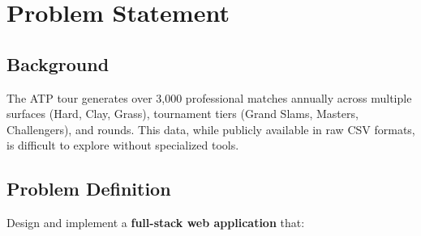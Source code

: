 \documentclass[12pt,a4paper]{article}
\begin{document}
\newpage
\section{Problem Statement}

\subsection{Background}
The ATP tour generates over 3,000 professional matches annually across multiple surfaces (Hard, Clay, Grass), tournament tiers (Grand Slams, Masters, Challengers), and rounds. This data, while publicly available in raw CSV formats, is difficult to explore without specialized tools.

\subsection{Problem Definition}
Design and implement a \textbf{full-stack web application} that:
\end{document}
